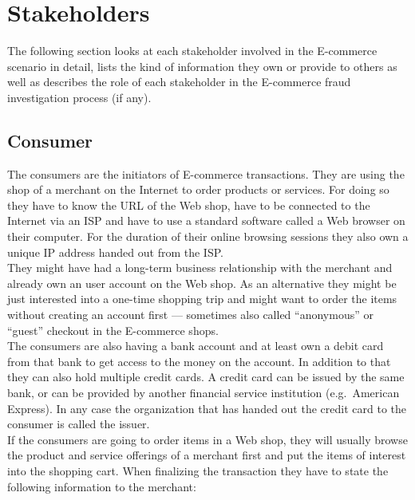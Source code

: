 
\section{Stakeholders}
\label{sec:stakeholder_analysis}

The following section looks at each stakeholder involved in the \gls{E-commerce} scenario in detail, lists the kind of information they own or provide to others as well as describes the role of each stakeholder in the \gls{E-commerce} fraud investigation process (if any).

\subsection{Consumer}
\label{subsec:stakeholder_consumer}

The consumers are the initiators of \gls{E-commerce} transactions. They are using the shop of a merchant on the Internet to order products or services. For doing so they have to know the \gls{URL} of the Web shop, have to be connected to the Internet via an \gls{ISP} and have to use a standard software called a Web browser on their computer. For the duration of their online browsing sessions they also own a unique \gls{IP} address handed out from the \gls{ISP}.\\

They might have had a long-term business relationship with the merchant and already own an user account on the Web shop. As an alternative they might be just interested into a one-time shopping trip and might want to order the items without creating an account first --- sometimes also called ``anonymous'' or ``guest'' checkout in the \gls{E-commerce} shops. \\

The consumers are also having a bank account and at least own a debit card from that bank to get access to the money on the account. In addition to that they can also hold multiple credit cards. A credit card can be issued by the same bank, or can be provided by another financial service institution (e.g.\ American Express). In any case the organization that has handed out the credit card to the consumer is called the issuer. \\

If the consumers are going to order items in a Web shop, they will usually browse the product and service offerings of a merchant first and put the items of interest into the shopping cart. When finalizing the transaction they have to state the following information to the merchant:\@

